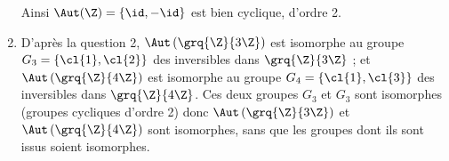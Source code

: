\begin{enumerate}
 Ainsi $\Aut(\Z) = \{\id, -\id \}$ est bien cyclique, d'ordre 2.

 \item D'après la question 2, $\Aut\left(\grq{\Z}{3\Z} \right)$ est isomorphe au groupe $G_3 = \{\cl{1},\cl{2}\}$ des inversibles dans $\grq{\Z}{3\Z}$ ; et $\Aut\left(\grq{\Z}{4\Z} \right)$ est isomorphe au groupe $G_4 = \{\cl{1},\cl{3}\}$ des inversibles dans $\grq{\Z}{4\Z}$. Ces deux groupes $G_3$ et $G_3$ sont isomorphes (groupes cycliques d'ordre 2) donc $\Aut\left(\grq{\Z}{3\Z} \right)$ et $\Aut\left(\grq{\Z}{4\Z} \right)$ sont isomorphes, sans que les groupes dont ils sont issus soient isomorphes.
\end{enumerate}


